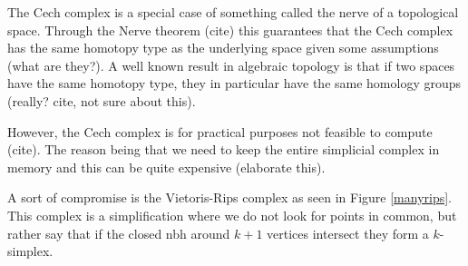 The Cech complex is a special case of something called the nerve of a topological space. Through the Nerve theorem (cite) this guarantees that the Cech complex has the same homotopy type as the underlying space given some assumptions (what are they?). A well known result in algebraic topology is that if two spaces have the same homotopy type, they in particular have the same homology groups (really? cite, not sure about this).

However, the Cech complex is for practical purposes not feasible to compute (cite). The reason being that we need to keep the entire simplicial complex in memory and this can be quite expensive (elaborate this).

A sort of compromise is the Vietoris-Rips complex as seen in Figure \ref{manyrips}. This complex is a simplification where we do not look for points in common, but rather say that if the closed nbh around $k+1$ vertices intersect they form a $k$-simplex.

